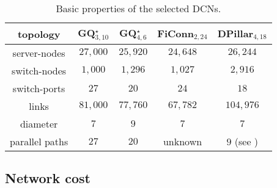 \documentclass[]{amsart}
\begin{document}
\begin{table}[ht]
\centering
\caption{Basic properties of the selected DCNs.}
\begin{tabular}{c|cccc}
        topology&GQ$^\star_{3,10}$&GQ$^\star_{4,6}$&FiConn$_{2,24}$&DPillar$_{4,18}$\\
        \hline
server-nodes & $27,000$ & $25,920$ & $24,648$ & $26,244$\\
switch-nodes & $1,000$ & $1,296$ & $1,027$ & $2,916$\\
switch-ports & $27$ & $20$ & $24$ & $18$\\
links & $81,000$ & $77,760$ & $67,782$ & $104,976$\\
diameter & $7$ & $9$ & $7$ & $7$\\
parallel paths & $27$ & $20$ & unknown & $9$ (see \cite{LiaoYinYin2012}) \\
\end{tabular}
\label{table:DCNs}
\end{table}


\subsection{Network cost}
\label{sec:network-cost}
\end{document}
